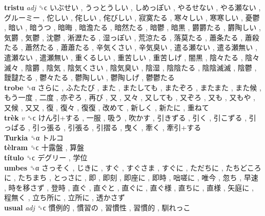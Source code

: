 \textbf{tristu} \emph{adj}  ␝ϲ   いぶせい ,  うっとうしい ,  しめっぽい ,  やるせない ,  やる瀬ない ,  グルーミー ,  佗しい ,  侘しい ,  侘びしい ,  寂寞たる ,  寒々しい ,  寒寒しい ,  憂鬱 ,  暗い ,  暗うつ ,  暗晦 ,  暗澹たる ,  暗然たる ,  暗鬱 ,  暗黒 ,  欝欝たる ,  欝陶しい ,  気欝 ,  気鬱 ,  沈鬱 ,  淅瀝たる ,  湿っぽい ,  荒涼たる ,  落莫たる ,  蕭条たる ,  蕭殺たる ,  蕭然たる ,  蕭蕭たる ,  辛気くさい ,  辛気臭い ,  遣る瀬ない ,  遣る瀬無い ,  遣瀬ない ,  遣瀬無い ,  重くるしい ,  重苦しい ,  重苦しげ ,  闇黒 ,  陰々たる ,  陰々滅々 ,  陰欝 ,  陰気 ,  陰気くさい ,  陰気臭い ,  陰湿 ,  陰陰たる ,  陰陰滅滅 ,  陰鬱 ,  靉靆たる ,  鬱々たる ,  鬱陶しい ,  鬱陶しげ ,  鬱鬱たる   \\
\textbf{trobe} ␝α   さらに ,  ふたたび ,  また ,  またしても ,  またぞろ ,  またまた ,  また候 ,  もう一度 ,  二度 ,  亦ぞろ ,  再び ,  又 ,  又々 ,  又しても ,  又ぞろ ,  又も ,  又もや ,  又候 ,  又又 ,  復 ,  復々 ,  復復 ,  改めて ,  新しく ,  新たに ,  重ねて   \\
\textbf{trèk} \emph{v}  ␝ϲ   けん引+する ,  一服 ,  吸う ,  吹かす ,  引きずる ,  引く ,  引こずる ,  引っぱる ,  引っ張る ,  引張る ,  引摺る ,  曳く ,  牽く ,  牽引+する   \\
\textbf{Turkia} ␝α   トルコ   \\
\textbf{tèlram} ␝ϲ   十露盤 ,  算盤   \\
\textbf{título} ␝ϲ   デグリー ,  学位   \\
\textbf{umbes} ␝α   さっそく ,  じきに ,  すぐ ,  すぐさま ,  すぐに ,  ただちに ,  たちどころに ,  たちまち ,  とっさに ,  即 ,  即刻 ,  即座に ,  即時 ,  咄嗟に ,  唯今 ,  忽ち ,  早速 ,  時を移さず ,  登時 ,  直ぐ ,  直ぐと ,  直ぐに ,  直ぐ様 ,  直ちに ,  直様 ,  矢庭に ,  程無く ,  立ち所に ,  立所に ,  透かさず   \\
\textbf{usual} \emph{adj}  ␝ϲ   慣例的 ,  慣習の ,  習慣性 ,  習慣的 ,  馴れっこ   \\
